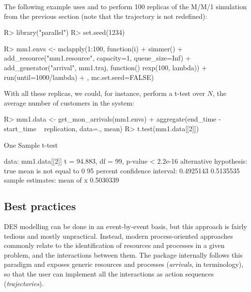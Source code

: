 \documentclass[
  nojss]{jss}
\begin{document}
The following example uses  and  to
perform 100 replicas of the M/M/1 simulation from the previous section
(note that the trajectory is not redefined):

\begin{CodeChunk}
\begin{CodeInput}
R> library("parallel")
R> set.seed(1234)
\end{CodeInput}
\end{CodeChunk}

\begin{CodeChunk}
\begin{CodeInput}
R> mm1.envs <- mclapply(1:100, function(i) {
+   simmer() %
+     add_resource("mm1.resource", capacity=1, queue_size=Inf) %
+     add_generator("arrival", mm1.traj, function() rexp(100, lambda)) %
+     run(until=1000/lambda) %
+ }, mc.set.seed=FALSE)
\end{CodeInput}
\end{CodeChunk}

With all these replicas, we could, for instance, perform a t-test over
\(N\), the average number of customers in the system:

\begin{CodeChunk}
\begin{CodeInput}
R> mm1.data <- get_mon_arrivals(mm1.envs) %
+   aggregate(end_time - start_time ~ replication, data=., mean)
R> t.test(mm1.data[[2]])
\end{CodeInput}
\begin{CodeOutput}

    One Sample t-test

data:  mm1.data[[2]]
t = 94.883, df = 99, p-value < 2.2e-16
alternative hypothesis: true mean is not equal to 0
95 percent confidence interval:
 0.4925143 0.5135535
sample estimates:
mean of x 
0.5030339 
\end{CodeOutput}
\end{CodeChunk}

\hypertarget{best-practices}{%
\subsection{Best practices}\label{best-practices}}

DES modelling can be done in an event-by-event basis, but this approach
is fairly tedious and mostly unpractical. Instead, modern
process-oriented approaches commonly relate to the identification of
resources and processes in a given problem, and the interactions between
them. The  package internally follows this paradigm and
exposes generic resources and processes (\emph{arrivals}, in
 terminology), so that the user can implement all the
interactions as action sequences (\emph{trajectories}).
\end{document}
